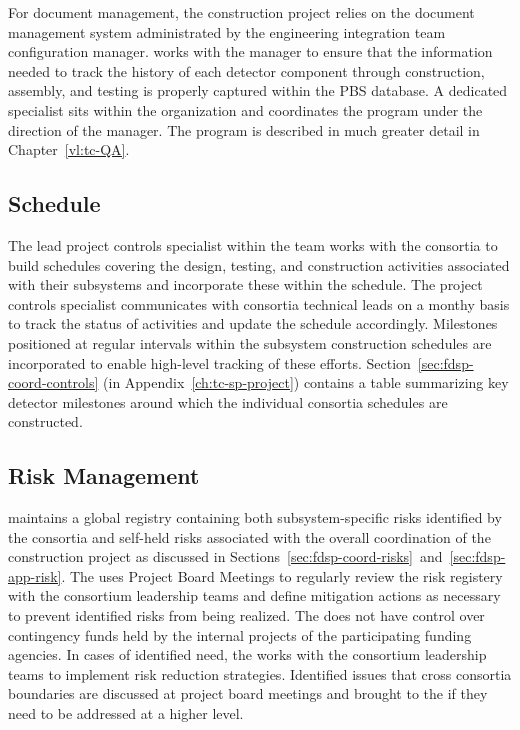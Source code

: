 For document management, the  construction project 
relies on the  document management system 
administrated by the  engineering integration team 
configuration manager.   works with the  
 manager to ensure that the information needed to track 
the history of each detector component through construction, 
assembly, and testing is properly captured within the PBS 
database.  A dedicated   specialist 
sits within the  organization and coordinates the 
  program under the direction of the
  manager.  The  
 program is described in much greater detail in 
Chapter~\ref{vl:tc-QA}.
 
\subsection{Schedule}

The lead project controls specialist within the  team works
with the  consortia to build schedules covering
the design, testing, and construction activities associated with their
subsystems and incorporate these within the 
schedule.  The project controls specialist communicates with consortia
technical leads on a monthy basis to track the status of activities
and update the  schedule accordingly.  Milestones
positioned at regular intervals within the subsystem construction
schedules are incorporated to enable high-level tracking of these
efforts.  Section~\ref{sec:fdsp-coord-controls} (in
Appendix~\ref{ch:tc-sp-project}) contains a table summarizing key
detector milestones around which the individual consortia
schedules are constructed.

\subsection{Risk Management}

  maintains a global registry containing both
subsystem-specific risks identified by the consortia and self-held
risks associated with the overall coordination of the 
construction project as discussed in
Sections~\ref{sec:fdsp-coord-risks}~and~\ref{sec:fdsp-app-risk}.  The
 uses Project Board Meetings to regularly review the
risk registery with the consortium leadership teams and define
mitigation actions as necessary to prevent identified risks from being
realized.  The  does not have control over
contingency funds held by the internal projects of the participating
funding agencies.  In cases of identified need, the 
works with the consortium leadership teams to implement risk
reduction strategies.  Identified issues that cross consortia
boundaries are discussed at project board meetings and brought to the
  if they need to be addressed at a higher
level.

